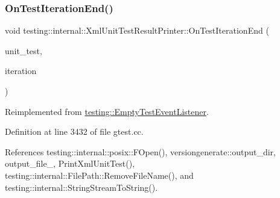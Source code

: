 \subsubsection{\texorpdfstring{On\+Test\+Iteration\+End()}{OnTestIterationEnd()}}
{\footnotesize\ttfamily void testing\+::internal\+::\+Xml\+Unit\+Test\+Result\+Printer\+::\+On\+Test\+Iteration\+End (\begin{DoxyParamCaption}\item[{const \hyperlink{classtesting_1_1UnitTest}{Unit\+Test} \&}]{unit\+\_\+test,  }\item[{int}]{iteration }\end{DoxyParamCaption})\hspace{0.3cm}{\ttfamily [virtual]}}



Reimplemented from \hyperlink{classtesting_1_1EmptyTestEventListener_a2253e5a18b3cf7bccd349567a252209d}{testing\+::\+Empty\+Test\+Event\+Listener}.



Definition at line 3432 of file gtest.\+cc.



References testing\+::internal\+::posix\+::\+F\+Open(), versiongenerate\+::output\+\_\+dir, output\+\_\+file\+\_\+, Print\+Xml\+Unit\+Test(), testing\+::internal\+::\+File\+Path\+::\+Remove\+File\+Name(), and testing\+::internal\+::\+String\+Stream\+To\+String().


